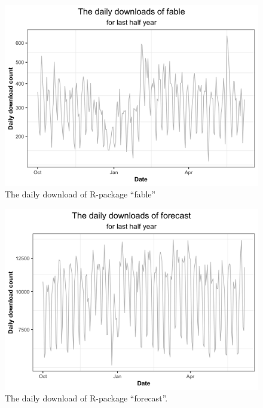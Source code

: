 \documentclass[
]{book}
\begin{document}
\begin{figure}

{\centering \includegraphics{figures/daily-fbl-1} 

}

\caption{The daily download of R-package ``fable''}\label{fig:daily-fbl}
\end{figure}



\begin{figure}

{\centering \includegraphics{figures/daily-fcst-1} 

}

\caption{The daily download of R-package ``forecast''.}\label{fig:daily-fcst}
\end{figure}
\end{document}

